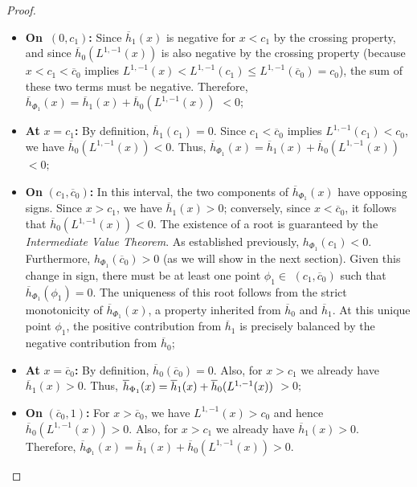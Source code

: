 \documentclass[10pt,a4paper]{amsart}
\begin{document}
\begin{proof}
\begin{itemize}
\item \textbf{On\ }$(0,c_{1})$\textbf{:} Since $\overline{h}_{1}(x)$ is
negative for $x<c_{1}$ by the crossing property, and since $\overline{h}%
_{0}(L^{1,-1}(x))$ is also negative by the crossing property (because $%
x<c_{1}<\overline{c}_{0}$ implies $L^{1,-1}(x)<L^{1,-1}(c_{1})\leq L^{1,-1}(%
\overline{c}_{0})=c_{0}$), the sum of these two terms must be negative.
Therefore,$\overline{h}_{\Phi _{1}}(x)=\overline{h}_{1}(x)+\overline{h}%
_{0}(L^{1,-1}(x))$ $<0$;

\item \textbf{At }$x=c_{1}$\textbf{:} By definition, $\overline{h}%
_{1}(c_{1})=0$. Since $c_{1}<\overline{c}_{0}$ implies $%
L^{1,-1}(c_{1})<c_{0} $, we have $\overline{h}_{0}(L^{1,-1}(x))<0$. Thus, $%
\overline{h}_{\Phi _{1}}(x)=\overline{h}_{1}(x)+\overline{h}%
_{0}(L^{1,-1}(x)) $ $<0;$

\item \textbf{On }$(c_{1},\overline{c}_{0})$\textbf{:} In this interval, the
two components of $\overline{h}_{\Phi _{1}}(x)$ have opposing signs. Since $%
x>c_{1}$, we have $\overline{h}_{1}(x)>0$; conversely, since $x<\overline{c}%
_{0}$, it follows that $\overline{h}_{0}(L^{1,-1}(x))<0$. The existence of a
root is guaranteed by the \textit{Intermediate Value Theorem}. As
established previously, $h_{\Phi _{1}}(c_{1})<0$. Furthermore, $h_{\Phi
_{1}}(\overline{c}_{0})>0$ (as we will show in the next section). Given this
change in sign, there must be at least one point $\phi _{1}\in $ $(c_{1},%
\overline{c}_{0})$ such that $\overline{h}_{\Phi _{1}}(\phi _{1})=0$. The
uniqueness of this root follows from the strict monotonicity of $\overline{h}%
_{\Phi _{1}}(x)$, a property inherited from $\overline{h}_{0}$ and $%
\overline{h}_{1}$. At this unique point $\phi _{1}$, the positive
contribution from $\overline{h}_{1}$ is precisely balanced by the negative
contribution from $\overline{h}_{0}$;

\item \textbf{At }$x=\overline{c}_{0}$\textbf{:} By definition, $\overline{h}%
_{0}(\overline{c}_{0})=0$. Also, for $x>c_{1}$ we already have $\overline{h}%
_{1}(x)>0$. Thus, $\overline{h}_{\Phi _{1}}(x)=\overline{h}_{1}(x)+\overline{%
h}_{0}(L^{1,-1}(x))$ $>0;$

\item \textbf{On }$(\overline{c}_{0},1)$\textbf{:} For $x>\overline{c}_{0}$,
we have $L^{1,-1}(x)>c_{0}$ and hence $\overline{h}_{0}(L^{1,-1}(x))>0$.
Also, for $x>c_{1}$ we already have $\overline{h}_{1}(x)>0$. Therefore, $%
\overline{h}_{\Phi _{1}}(x)=\overline{h}_{1}(x)+\overline{h}%
_{0}(L^{1,-1}(x))>0.$
\end{itemize}


\end{proof}
\end{document}
